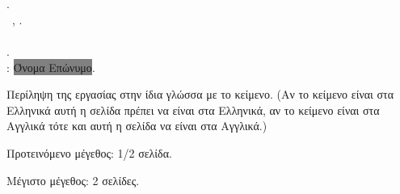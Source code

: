 \chapter*{\abstractname}
\label{ch:Abstract}
\addstarredchapter{\abstractname} %
\makeatletter

\@author.\\
\cseabstracttype\ \cseabstractcs, \@date.\\
\cseabstractdpt\\
\@title.\\
\cseabstractsup: \colorbox{gray}{Όνομα Επώνυμο}.\\
\bigskip

\noindent Περίληψη της εργασίας στην ίδια γλώσσα με το 
κείμενο. (Αν το κείμενο είναι στα Ελληνικά αυτή η σελίδα
πρέπει να είναι στα Ελληνικά, αν το κείμενο είναι στα
Αγγλικά τότε και αυτή η σελίδα να είναι στα Αγγλικά.)

\y\noindent Προτεινόμενο μέγεθος: 1/2 σελίδα.

\y\noindent Μέγιστο μέγεθος: 2 σελίδες.
